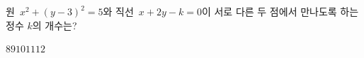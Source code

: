 원~$x^2+(y-3)^2=5$와 직선~$x+2y-k=0$이 서로 다른 두 점에서 만나도록 하는 정수 $k$의 개수는?
\begin{choices32}{$8$}{$9$}{$10$}{$11$}{$12$}\end{choices32}
